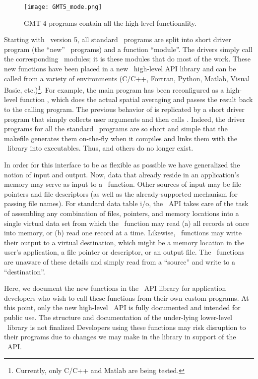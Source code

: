 \documentclass[11pt]{report}
\begin{document}
\begin{figure}[h]
	\centering
	\texttt{[image: GMT5\_mode.png]}
	\caption{GMT 4 programs contain all the high-level functionality.}
\end{figure}
Starting with \GMT\ version 5, all standard \GMT\ programs are split into short driver
program (the ``new'' \GMT\  programs) and a function ``module''.  The drivers simply call the corresponding \GMT\ modules;
it is these modules that do most of the work.  These new functions have been placed
in a new \GMT\ high-level API library and can be called from a variety of environments
(C/C++, Fortran, Python, Matlab, Visual Basic, etc.)\footnote{Currently, only C/C++ and Matlab are being tested.}.
For example, the main program
 has been reconfigured as a high-level function ,
which does the actual spatial averaging and passes the result back to the calling program.
The previous behavior of  is replicated by a short driver program
that simply collects user arguments and then calls .  Indeed, the driver
programs for all the standard \GMT\ programs are so short and simple that the makefile generates them
on-the-fly when it compiles and links them with the \GMT\ library into executables.
Thus,  and others do no longer exist.

In order for this interface to be as flexible as possible we have generalized the notion of input
and output. Now, data that already reside in an application's memory may serve as
input to a \GMT\ function.  Other sources of input may be file pointers
and file descriptors (as well as the already-supported mechanism for passing file names).
For standard data table i/o, the \GMT\ API takes care of the task of assembling any combination
of files, pointers, and memory locations into a single virtual data set from which the \GMT\
function may read (a) all records at once into memory, or (b) read one record at a time.
Likewise, \GMT\ functions may write their output to a virtual destination, which
might be a memory location in the user's application, a file pointer or descriptor, or
an output file.  The \GMT\ functions are unaware of these details and simply
read from a ``source'' and write to a ``destination''.

Here, we document the new functions in the \GMT\ API library for application developers
who wish to call these functions from their own custom programs.  At this point,
only the new high-level \GMT\ API is fully documented and intended for public use.
The structure and documentation of the under-lying lower-level \GMT\ library is not finalized
Developers using these functions may risk disruption to their programs due to changes we may
make in the library in support of the \GMT\ API.
\end{document}
